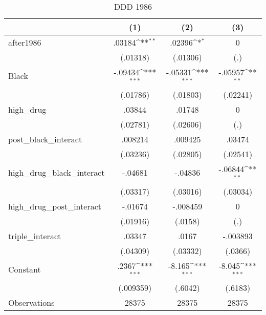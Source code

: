 \begin{table}[htbp]\centering
\def\sym#1{\ifmmode^{#1}\else\(^{#1}\)\fi}
\caption{DDD 1986}
\begin{tabular}{l*{3}{c}}
\hline\hline
                    &\multicolumn{1}{c}{(1)}         &\multicolumn{1}{c}{(2)}         &\multicolumn{1}{c}{(3)}         \\
\hline
after1986           &      .03184\sym{**} &      .02396\sym{*}  &           0         \\
                    &    (.01318)         &    (.01306)         &         (.)         \\
[1em]
Black               &     -.09434\sym{***}&     -.05331\sym{***}&     -.05957\sym{**} \\
                    &    (.01786)         &    (.01803)         &    (.02241)         \\
[1em]
high\_drug           &      .03844         &      .01748         &           0         \\
                    &    (.02781)         &    (.02606)         &         (.)         \\
[1em]
post\_black\_interact &     .008214         &     .009425         &      .03474         \\
                    &    (.03236)         &    (.02805)         &    (.02541)         \\
[1em]
high\_drug\_black\_interact&     -.04681         &     -.04836         &     -.06844\sym{**} \\
                    &    (.03317)         &    (.03016)         &    (.03034)         \\
[1em]
high\_drug\_post\_interact&     -.01674         &    -.008459         &           0         \\
                    &    (.01916)         &     (.0158)         &         (.)         \\
[1em]
triple\_interact     &      .03347         &       .0167         &    -.003893         \\
                    &    (.04309)         &    (.03332)         &     (.0366)         \\
[1em]
Constant            &       .2367\sym{***}&      -8.165\sym{***}&      -8.045\sym{***}\\
                    &   (.009359)         &     (.6042)         &     (.6183)         \\
\hline
Observations        &       28375         &       28375         &       28375         \\

\end{tabular}
\end{table}
